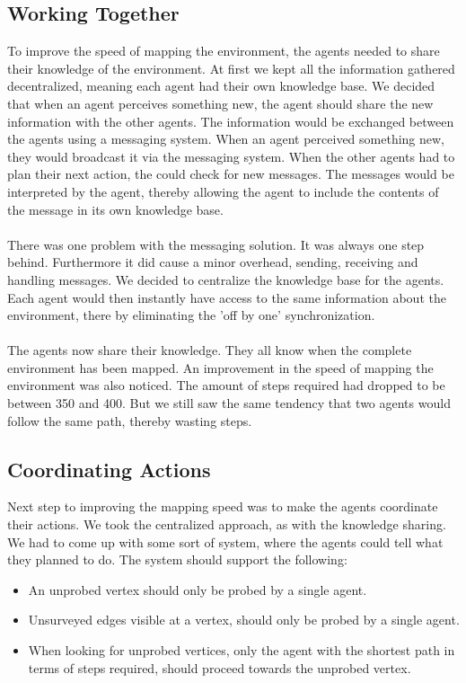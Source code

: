 \documentclass[11pt]{report}
\begin{document}
\subsection*{Working Together}
To improve the speed of mapping the environment, the agents needed to share their knowledge of the environment. At first we kept all the information gathered decentralized, meaning each agent had their own knowledge base. We decided that when an agent perceives something new, the agent should share the new information with the other agents. The information would be exchanged between the agents using a messaging system. When an agent perceived something new, they would broadcast it via the messaging system. When the other agents had to plan their next action, the could check for new messages. The messages would be interpreted by the agent, thereby allowing the agent to include the contents of the message in its own knowledge base.\\
\\
There was one problem with the messaging solution. It was always one step behind. Furthermore it did cause a minor overhead, sending, receiving and handling messages. We decided to centralize the knowledge base for the agents. Each agent would then instantly have access to the same information about the environment, there by eliminating the 'off by one' synchronization.\\
\\
The agents now share their knowledge. They all know when the complete environment has been mapped. An improvement in the speed of mapping the environment was also noticed. The amount of steps required had dropped to be between 350 and 400. But we still saw the same tendency that two agents would follow the same path, thereby wasting steps.

\subsection*{Coordinating Actions}
Next step to improving the mapping speed was to make the agents coordinate their actions. We took the centralized approach, as with the knowledge sharing. We had to come up with some sort of system, where the agents could tell what they planned to do. The system should support the following:
\begin{itemize}
	\item An unprobed vertex should only be probed by a single agent.
	\item Unsurveyed edges visible at a vertex, should only be probed by a single agent.
	\item When looking for unprobed vertices, only the agent with the shortest path in terms of steps required, should proceed towards the unprobed vertex.
\end{itemize}
\end{document}
